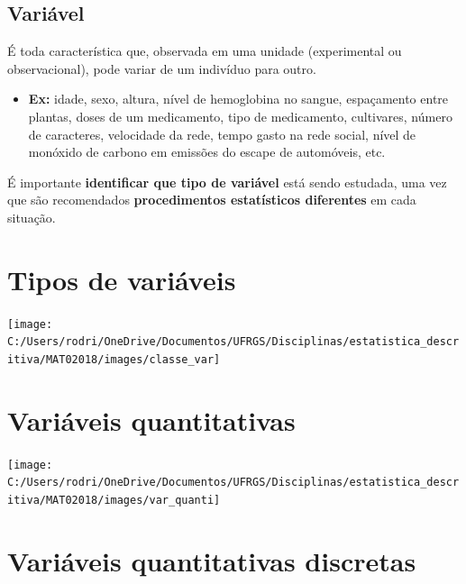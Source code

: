 \documentclass[]{tufte-book}
\providecommand{\tightlist}{%
  \setlength{\itemsep}{0pt}\setlength{\parskip}{0pt}}
\begin{document}
\begin{block}

\hypertarget{variuxe1vel}{%
\subsection{Variável}\label{variuxe1vel}}

É toda característica que, observada em uma unidade (experimental ou
observacional), pode variar de um indivíduo para outro.\\

\begin{itemize}
\tightlist
\item
  \textbf{Ex:} idade, sexo, altura, nível de hemoglobina no sangue,
  espaçamento entre plantas, doses de um medicamento, tipo de
  medicamento, cultivares, número de caracteres, velocidade da rede,
  tempo gasto na rede social, nível de monóxido de carbono em emissões
  do escape de automóveis, etc.
\end{itemize}

\end{block}

É importante \textbf{identificar que tipo de variável} está sendo
estudada, uma vez que são recomendados \textbf{procedimentos
estatísticos diferentes} em cada situação.

\hypertarget{tipos-de-variuxe1veis}{%
\section{Tipos de variáveis}\label{tipos-de-variuxe1veis}}

\begin{center}\texttt{[image: C:/Users/rodri/OneDrive/Documentos/UFRGS/Disciplinas/estatistica\_descritiva/MAT02018/images/classe\_var]} \end{center}

\hypertarget{variuxe1veis-quantitativas}{%
\section{Variáveis quantitativas}\label{variuxe1veis-quantitativas}}

\begin{center}\texttt{[image: C:/Users/rodri/OneDrive/Documentos/UFRGS/Disciplinas/estatistica\_descritiva/MAT02018/images/var\_quanti]} \end{center}

\hypertarget{variuxe1veis-quantitativas-discretas}{%
\section{Variáveis quantitativas
discretas}\label{variuxe1veis-quantitativas-discretas}}
\end{document}
